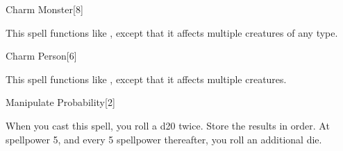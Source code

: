 \begin{spellfooter}
\begin{spellsection}[Mass]{Charm Monster}[8]
    \begin{spellheader}
    \end{spellheader}
    \begin{spellcontent}
        \begin{spelltargetinginfo}
        \end{spelltargetinginfo}
        \begin{spelleffects}
            \spellspecial This spell functions like , except that it affects multiple creatures of any type.
        \end{spelleffects}
    \end{spellcontent}
    \begin{spellfooter}
        \miscastyou
    \end{spellfooter}
\end{spellsection}

\begin{spellsection}[Mass]{Charm Person}[6]
    \begin{spellheader}
    \end{spellheader}
    \begin{spellcontent}
        \begin{spelltargetinginfo}
        \end{spelltargetinginfo}
        \begin{spelleffects}
            \spellspecial This spell functions like , except that it affects multiple creatures.
        \end{spelleffects}
    \end{spellcontent}
    \begin{spellfooter}
        \miscastexplode
    \end{spellfooter}
\end{spellsection}


\begin{spellsection}[Lesser]{Manipulate Probability}[2]
    \begin{spellheader}
    \end{spellheader}
    \begin{spellcontent}
        \begin{spelltargetinginfo}
        \end{spelltargetinginfo}
        \begin{spelleffects}
            \spelleffect When you cast this spell, you roll a d20 twice. Store the results in order. At spellpower 5, and every 5 spellpower thereafter, you roll an additional die.


\end{spelleffects}
\end{spellcontent}
\end{spellsection}
\end{spellfooter}
